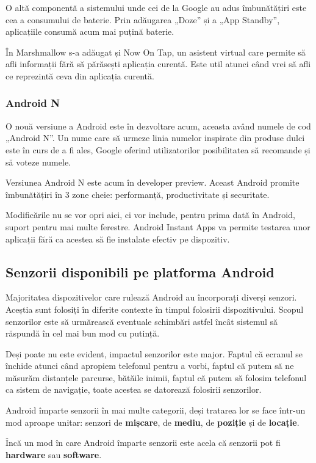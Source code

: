 \documentclass[12pt,a4paper]{article}
\begin{document}
	O altă componentă a sistemului unde cei de la Google au adus îmbunătățiri este cea a consumului de baterie. Prin adăugarea „Doze” și a „App Standby”, aplicațiile consumă acum mai puțină baterie.

	În Marshmallow s-a adăugat și Now On Tap, un asistent virtual care permite să afli informații fără să părăsești aplicația curentă. Este util atunci când vrei să afli ce reprezintă ceva din aplicația curentă.


\subsubsection{Android N}
O nouă versiune a Android este în dezvoltare acum, aceasta având numele de cod „Android N”. Un nume care să urmeze linia numelor inspirate din produse dulci este în curs de a fi ales, Google oferind utilizatorilor posibilitatea să recomande și să voteze numele.
	
	Versiunea Android N este acum în developer preview. Aceast Android promite îmbunătățiri în 3 zone cheie: performanță, productivitate și securitate.
	
	Modificările nu se vor opri aici, ci vor include, pentru prima dată în Android, suport pentru mai multe ferestre. Android Instant Apps va permite testarea unor aplicații fără ca acestea să fie instalate efectiv pe dispozitiv.
	

\subsection{Senzorii disponibili pe platforma Android}
Majoritatea dispozitivelor care rulează Android au încorporați diverși senzori. Aceștia sunt folosiți în diferite contexte în timpul folosirii dispozitivului. Scopul senzorilor este să urmărească eventuale schimbări astfel încât sistemul să răspundă în cel mai bun mod cu putință.

	Deși poate nu este evident, impactul senzorilor este major. Faptul că ecranul se închide atunci când apropiem telefonul pentru a vorbi, faptul că putem să ne măsurăm distanțele parcurse, bătăile inimii, faptul că putem să folosim telefonul ca sistem de navigație, toate acestea se datorează folosirii senzorilor.
	
	Android împarte senzorii în mai multe categorii, deși tratarea lor se face într-un mod aproape unitar: senzori de \textbf{mișcare}, de \textbf{mediu}, de \textbf{poziție} și de \textbf{locație}.

	Încă un mod în care Android împarte senzorii este acela că senzorii pot fi \textbf{hardware} sau \textbf{software}.\\
	
\end{document}
